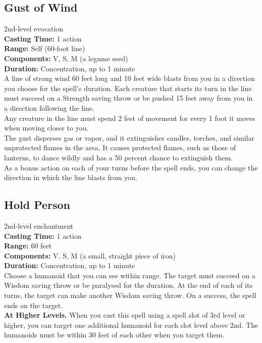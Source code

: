 \documentclass[11pt, A4paper, english]{article}
\begin{document}
		\subsection{Gust of Wind}
2nd-level evocation \\
\textbf{Casting Time:} 1 action \\
\textbf{Range:} Self (60-foot line) \\
\textbf{Components:} V, S, M (a legume seed) \\
\textbf{Duration:} Concentration, up to 1 minute \\
A line of strong wind 60 feet long and 10 feet wide blasts from you in a direction you choose for the spell’s duration. Each creature that starts its turn in the line must succeed on a Strength saving throw or be pushed 15 feet away from you in a direction following the line. \\
Any creature in the line must spend 2 feet of movement for every 1 foot it moves when moving closer to you. \\
The gust disperses gas or vapor, and it extinguishes candles, torches, and similar unprotected flames in the area. It causes protected flames, such as those of lanterns, to dance wildly and has a 50 percent chance to extinguish them. \\
As a bonus action on each of your turns before the spell ends, you can change the direction in which the line blasts from you.

		\subsection{Hold Person}
2nd-level enchantment \\
\textbf{Casting Time:} 1 action \\
\textbf{Range:} 60 feet \\
\textbf{Components:} V, S, M (a small, straight piece of iron) \\
\textbf{Duration:} Concentration, up to 1 minute \\
Choose a humanoid that you can see within range. The target must succeed on a Wisdom saving throw or be paralysed for the duration. At the end of each of its turns, the target can make another Wisdom saving throw. On a success, the spell ends on the target. \\
\textbf{At Higher Levels.} When you cast this spell using a spell slot of 3rd level or higher, you can target one additional humanoid for each slot level above 2nd. The humanoids must be within 30 feet of each other when you target them.
\end{document}
